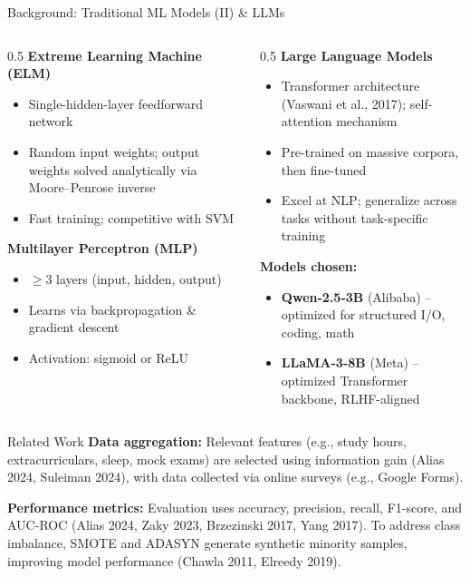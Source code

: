 \documentclass[aspectratio=169]{beamer}
\begin{document}
\begin{frame}{Background: Traditional ML Models (II) \& LLMs}
\begin{columns}[T]
\begin{column}{0.5\textwidth}
\textbf{Extreme Learning Machine (ELM)}
\begin{itemize}
    \item Single-hidden-layer feedforward network
    \item Random input weights; output weights solved analytically via Moore--Penrose inverse
    \item Fast training; competitive with SVM
\end{itemize}

\vspace{0.2cm}
\textbf{Multilayer Perceptron (MLP)}
\begin{itemize}
    \item $\geq 3$ layers (input, hidden, output)
    \item Learns via backpropagation \& gradient descent
    \item Activation: sigmoid or ReLU
\end{itemize}
\end{column}

\begin{column}{0.5\textwidth}
\textbf{Large Language Models}
\begin{itemize}
    \item Transformer architecture (Vaswani et al., 2017); self-attention mechanism
    \item Pre-trained on massive corpora, then fine-tuned
    \item Excel at NLP; generalize across tasks without task-specific training
\end{itemize}

\vspace{0.2cm}
\textbf{Models chosen:}
\begin{itemize}
    \item \textbf{Qwen-2.5-3B} (Alibaba) -- optimized for structured I/O, coding, math
    \item \textbf{LLaMA-3-8B} (Meta) -- optimized Transformer backbone, RLHF-aligned
\end{itemize}
\end{column}
\end{columns}
\end{frame}

\begin{frame}{Related Work}
	\textbf{Data aggregation:}
	Relevant features (e.g., study hours, extracurriculars, sleep, mock exams) are selected using information gain (Alias 2024, Suleiman 2024), with data collected via online surveys (e.g., Google Forms).
	
	\vspace{0.3cm}
	\textbf{Performance metrics:}
	Evaluation uses accuracy, precision, recall, F1-score, and AUC-ROC (Alias 2024, Zaky 2023, Brzezinski 2017, Yang 2017). To address class imbalance, SMOTE and ADASYN generate synthetic minority samples, improving model performance (Chawla 2011, Elreedy 2019).
\end{frame}
\end{document}
